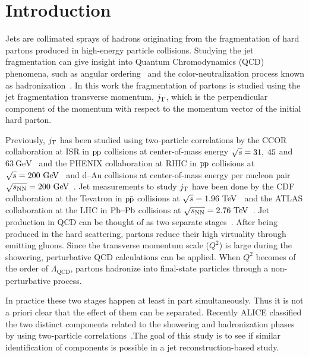 \linenumbers

\section{Introduction}
\label{sec:introduction}
Jets are collimated sprays of hadrons originating from the fragmentation of hard partons produced in high-energy particle collisions. Studying the jet fragmentation can give insight into Quantum Chromodynamics (QCD)~\cite{gross1973ultraviolet, politzer1973reliable, gross1973asymptotically, gross1974asymptotically, georgi1974electroproduction} phenomena, such as angular ordering~\cite{basicsofpqcd} and the color-neutralization process known as hadronization~\cite{introPythia81,herwigManual,herwig7releaseNote}. In this work the fragmentation of partons is studied using the jet fragmentation transverse momentum, $\jt{}$, which is the perpendicular component of the momentum with respect to the momentum vector of the initial hard parton.

Previously, $\jt{}$ has been studied using two-particle correlations by the CCOR collaboration at ISR in $\pp$ collisions at center-of-mass energy $\sqrtS = 31,\;45$ and $63~\mathrm{GeV}$~\cite{firstjtmeasurement} and the PHENIX collaboration at RHIC in $\pp$ collisions at $\sqrtSE[GeV]{200}$~\cite{PHENIXjets} and d--Au collisions at center-of-mass energy per nucleon pair $\sqrtSnnE[GeV]{200}$~\cite{phenixJtPAu}. 
Jet measurements to study $\jt{}$ have been done by the CDF collaboration at the Tevatron in $\ppbar$ collisions at $\sqrtSE{1.96}$~\cite{cdfpaper} and the ATLAS collaboration at the LHC in $\PbPb$ collisions at $\sqrtSnnE{2.76}$~\cite{atlaksenJetit}.
Jet production in QCD can be thought of as two separate stages~\cite{eventGenerators}. After being produced in the hard scattering, partons reduce their high virtuality through emitting gluons. Since the transverse momentum scale ($Q^{2}$) is large during the showering, perturbative QCD calculations can be applied. When $Q^{2}$ becomes of the order of $\Lambda_{\mathrm{QCD}}$, partons hadronize into final-state particles through a non-perturbative process. 

In practice these two stages happen at least in part simultaneously. %
Thus it is not a priori clear that the effect of them can be separated. Recently ALICE classified the two distinct components related to the showering and hadronization phases by using two-particle correlations~\cite{ALICEjt}.The goal of this study is to see if similar identification of components is possible in a jet reconstruction-based study. 

